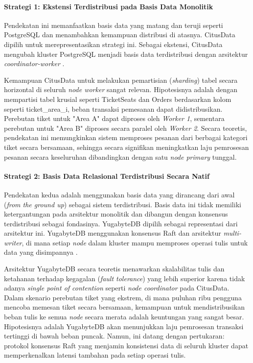 \paragraph{Strategi 1: Ekstensi Terdistribusi pada Basis Data Monolitik}

Pendekatan ini memanfaatkan basis data yang matang dan teruji seperti PostgreSQL dan menambahkan kemampuan distribusi di atasnya. CitusData dipilih untuk merepresentasikan strategi ini. Sebagai ekstensi, CitusData mengubah kluster PostgreSQL menjadi basis data terdistribusi dengan arsitektur \textit{coordinator-worker} \parencite{citus}.

Kemampuan CitusData untuk melakukan pemartisian (\textit{sharding}) tabel secara horizontal di seluruh \textit{node worker} sangat relevan. Hipotesisnya adalah dengan mempartisi tabel krusial seperti TicketSeats dan Orders berdasarkan kolom seperti ticket\_area\_i, beban transaksi pemesanan dapat didistribusikan. Perebutan tiket untuk "Area A" dapat diproses oleh \textit{Worker 1}, sementara perebutan untuk "Area B" diproses secara paralel oleh \textit{Worker 2}. Secara teoretis, pendekatan ini memungkinkan sistem memproses pesanan dari berbagai kategori tiket secara bersamaan, sehingga secara signifikan meningkatkan laju pemrosesan pesanan secara keseluruhan dibandingkan dengan satu \textit{node primary} tunggal.

\paragraph{Strategi 2: Basis Data Relasional Terdistribusi Secara Natif}

Pendekatan kedua adalah menggunakan basis data yang dirancang dari awal (\textit{from the ground up}) sebagai sistem terdistribusi. Basis data ini tidak memiliki ketergantungan pada arsitektur monolitik dan dibangun dengan konsensus terdistribusi sebagai fondasinya. YugabyteDB dipilih sebagai representasi dari arsitektur ini. YugabyteDB menggunakan konsensus Raft dan arsitektur \textit{multi-writer}, di mana setiap \textit{node} dalam kluster mampu memproses operasi tulis untuk data yang disimpannya \parencite{yugabyte}.

Arsitektur YugabyteDB secara teoretis menawarkan skalabilitas tulis dan ketahanan terhadap kegagalan (\textit{fault tolerance}) yang lebih superior karena tidak adanya \textit{single point of contention} seperti \textit{node coordinator} pada CitusData. Dalam skenario perebutan tiket yang ekstrem, di mana puluhan ribu pengguna mencoba memesan tiket secara bersamaan, kemampuan untuk mendistribusikan beban tulis ke semua \textit{node} secara merata adalah keuntungan yang sangat besar. Hipotesisnya adalah YugabyteDB akan menunjukkan laju pemrosesan transaksi tertinggi di bawah beban puncak. Namun, ini datang dengan pertukaran: protokol konsensus Raft yang menjamin konsistensi data di seluruh kluster dapat memperkenalkan latensi tambahan pada setiap operasi tulis.

